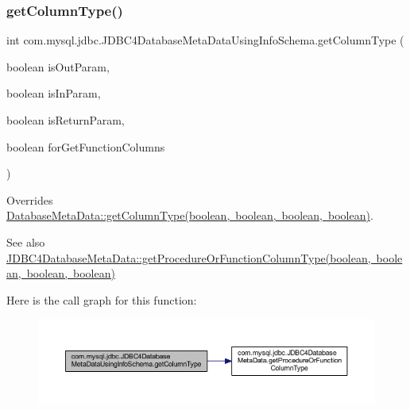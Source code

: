 \subsubsection{\texorpdfstring{get\+Column\+Type()}{getColumnType()}}
{\footnotesize\ttfamily int com.\+mysql.\+jdbc.\+J\+D\+B\+C4\+Database\+Meta\+Data\+Using\+Info\+Schema.\+get\+Column\+Type (\begin{DoxyParamCaption}\item[{boolean}]{is\+Out\+Param,  }\item[{boolean}]{is\+In\+Param,  }\item[{boolean}]{is\+Return\+Param,  }\item[{boolean}]{for\+Get\+Function\+Columns }\end{DoxyParamCaption})\hspace{0.3cm}{\ttfamily [protected]}}

Overrides \mbox{\hyperlink{classcom_1_1mysql_1_1jdbc_1_1_database_meta_data_a8db5167e582f242a48275aaffc5aa04a}{Database\+Meta\+Data\+::get\+Column\+Type(boolean, boolean, boolean, boolean)}}.

\begin{DoxySeeAlso}{See also}
\mbox{\hyperlink{classcom_1_1mysql_1_1jdbc_1_1_j_d_b_c4_database_meta_data_a2792991e9a30eabf05de200840c80a42}{J\+D\+B\+C4\+Database\+Meta\+Data\+::get\+Procedure\+Or\+Function\+Column\+Type(boolean, boolean, boolean, boolean)}} 
\end{DoxySeeAlso}
Here is the call graph for this function\+:
\nopagebreak
\begin{figure}[H]
\begin{center}
\leavevmode
\includegraphics[width=350pt]{classcom_1_1mysql_1_1jdbc_1_1_j_d_b_c4_database_meta_data_using_info_schema_af4f257273acbcd56b426db37f2fdf11c_cgraph}
\end{center}
\end{figure}
\mbox{\label{classcom_1_1mysql_1_1jdbc_1_1_j_d_b_c4_database_meta_data_using_info_schema_aff798ecd15c3d9daa81bc49f9ba9aa48}} 
